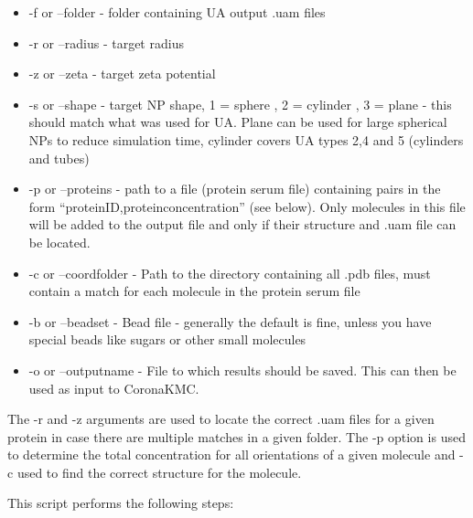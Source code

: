 \documentclass[10pt,a4paper,onecolumn]{report}
\begin{document}
\begin{itemize}
\item -f or --folder - folder containing UA output .uam files
\item -r or --radius - target radius
\item -z or --zeta - target zeta potential
\item -s or --shape - target NP shape, 1 = sphere , 2 = cylinder , 3 = plane - this should match what was used for UA. Plane can be used for large spherical NPs to reduce simulation time, cylinder covers UA types 2,4 and 5 (cylinders and tubes)
\item -p or --proteins - path to a file (protein serum file) containing pairs in the form ``proteinID,proteinconcentration'' (see below). Only molecules in this file will be added to the output file and only if their structure and .uam file can be located.
\item -c or --coordfolder - Path to the directory containing all .pdb files, must contain a match for each molecule in the protein serum file 
\item -b or --beadset - Bead file - generally the default is fine, unless you have special beads like sugars or other small molecules
\item -o or --outputname - File to which results should be saved. This can then be used as input to CoronaKMC.
\end{itemize}
 
 The -r and -z arguments are used to locate the correct .uam files for a given protein in case there are multiple matches in a given folder. The -p option is used to determine the total concentration for all orientations of a given molecule and -c used to find the correct structure for the molecule.
 
This script performs the following steps:
\end{document}
